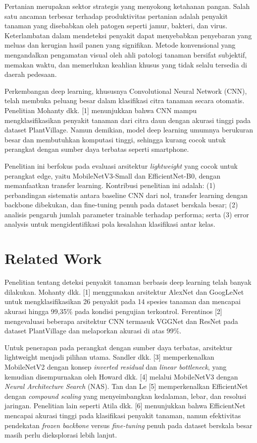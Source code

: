 \documentclass[conference,a4paper]{IEEEtran}
\begin{document}
Pertanian merupakan sektor strategis yang menyokong ketahanan pangan. Salah satu ancaman terbesar terhadap produktivitas pertanian adalah penyakit tanaman yang disebabkan oleh patogen seperti jamur, bakteri, dan virus. Keterlambatan dalam mendeteksi penyakit dapat menyebabkan penyebaran yang meluas dan kerugian hasil panen yang signifikan. Metode konvensional yang mengandalkan pengamatan visual oleh ahli patologi tanaman bersifat subjektif, memakan waktu, dan memerlukan keahlian khusus yang tidak selalu tersedia di daerah pedesaan.

Perkembangan deep learning, khususnya Convolutional Neural Network (CNN), telah membuka peluang besar dalam klasifikasi citra tanaman secara otomatis. Penelitian Mohanty dkk. [1] menunjukkan bahwa CNN mampu mengklasifikasikan penyakit tanaman dari citra daun dengan akurasi tinggi pada dataset PlantVillage. Namun demikian, model deep learning umumnya berukuran besar dan membutuhkan komputasi tinggi, sehingga kurang cocok untuk perangkat dengan sumber daya terbatas seperti smartphone.

Penelitian ini berfokus pada evaluasi arsitektur \emph{lightweight} yang cocok untuk perangkat edge, yaitu MobileNetV3-Small dan EfficientNet-B0, dengan memanfaatkan transfer learning. Kontribusi penelitian ini adalah: (1) perbandingan sistematis antara baseline CNN dari nol, transfer learning dengan backbone dibekukan, dan fine-tuning penuh pada dataset berskala besar; (2) analisis pengaruh jumlah parameter trainable terhadap performa; serta (3) error analysis untuk mengidentifikasi pola kesalahan klasifikasi antar kelas.

\section{Related Work}

Penelitian tentang deteksi penyakit tanaman berbasis deep learning telah banyak dilakukan. Mohanty dkk. [1] menggunakan arsitektur AlexNet dan GoogLeNet untuk mengklasifikasikan 26 penyakit pada 14 spesies tanaman dan mencapai akurasi hingga 99,35\% pada kondisi pengujian terkontrol. Ferentinos [2] mengevaluasi beberapa arsitektur CNN termasuk VGGNet dan ResNet pada dataset PlantVillage dan melaporkan akurasi di atas 99\%.

Untuk penerapan pada perangkat dengan sumber daya terbatas, arsitektur lightweight menjadi pilihan utama. Sandler dkk. [3] memperkenalkan MobileNetV2 dengan konsep \emph{inverted residual} dan \emph{linear bottleneck}, yang kemudian disempurnakan oleh Howard dkk. [4] melalui MobileNetV3 dengan \emph{Neural Architecture Search} (NAS). Tan dan Le [5] memperkenalkan EfficientNet dengan \emph{compound scaling} yang menyeimbangkan kedalaman, lebar, dan resolusi jaringan. Penelitian lain seperti Atila dkk. [6] menunjukkan bahwa EfficientNet mencapai akurasi tinggi pada klasifikasi penyakit tanaman, namun efektivitas pendekatan \emph{frozen backbone} versus \emph{fine-tuning} penuh pada dataset berskala besar masih perlu dieksplorasi lebih lanjut.
\end{document}
